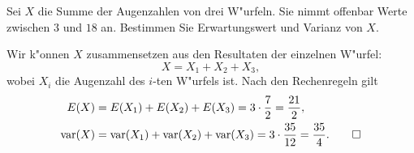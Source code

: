 Sei $X$ die Summe der Augenzahlen von drei W"urfeln.
Sie nimmt offenbar Werte zwischen $3$ und $18$ an. Bestimmen
Sie Erwartungswert und Varianz von $X$.

\begin{loesung}
Wir k"onnen $X$ zusammensetzen aus den Resultaten der einzelnen
W"urfel:
\[
X=X_1+X_2+X_3,
\]
wobei $X_i$ die Augenzahl des $i$-ten W"urfels ist.
Nach den Rechenregeln gilt
\begin{align*}
E(X)&=E(X_1)+E(X_2)+E(X_3)=3\cdot\frac72=\frac{21}{2},\\
\operatorname{var}(X)&=
\operatorname{var}(X_1)+
\operatorname{var}(X_2)+
\operatorname{var}(X_3)=3\cdot \frac{35}{12}=\frac{35}{4}.
\qedhere
\end{align*}
\end{loesung}

